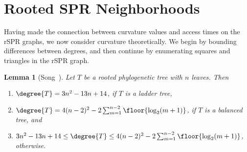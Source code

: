 \documentclass[11pt,onecolumn,conference]{IEEEtran}
\newtheorem{lemma}[theorem]{Lemma}
\begin{document}
\section{Rooted SPR Neighborhoods}
Having made the connection between curvature values and access times on the rSPR graphs, we now consider curvature theoretically.
We begin by bounding differences between degrees, and then continue by enumerating squares and triangles in the rSPR graph.

\begin{lemma}[{Song~\cite{Song2003-gf}}]
    \pushQED{\qed}
	\label{lem:degree_extremes}
	Let $T$ be a rooted phylogenetic tree with $n$ leaves. Then
	\begin{enumerate}
		\item $\degree{T} = 3n^2 - 13n + 14$, if $T$ is a ladder tree,
		\item $\degree{T} = 4(n-2)^2 - 2 \sum_{m=1}^{n-2} \floor{\log_2(m+1)}$, if $T$ is a balanced tree, and
		\item  $3n^2 - 13n + 14 \le \degree{T} \le 4(n-2)^2 - 2 \sum_{m=1}^{n-2} \floor{\log_2(m+1)}$, otherwise.
	\end{enumerate}
    \popQED
\end{lemma}
\end{document}
